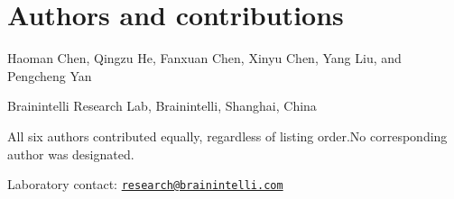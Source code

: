 \documentclass{article}
\begin{document}
\section*{Authors and contributions}

\noindent Haoman Chen, Qingzu He, Fanxuan Chen, Xinyu Chen, Yang Liu, and Pengcheng Yan\par
\noindent Brainintelli Research Lab, Brainintelli, Shanghai, China\par
\smallskip
\noindent All six authors contributed equally, regardless of listing order.\newline No corresponding author was designated.\par
\smallskip
\noindent Laboratory contact: \href{mailto:research@brainintelli.com}{\texttt{research@brainintelli.com}}\par
\end{document}

